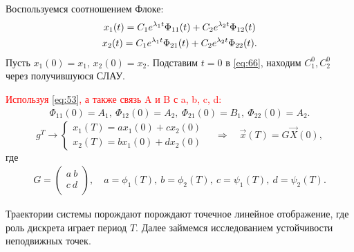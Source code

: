 Воспользуемся соотношением Флоке:
\begin{gather}
	x_1(t)=C_1 e^{\lambda_1 t}\Phi_{11}(t)+C_2 e^{\lambda_2 t}\Phi_{12}(t) \notag \\ 
	x_2(t)=C_1 e^{\lambda_1 t}\Phi_{21}(t)+C_2 e^{\lambda_2 t}\Phi_{22}(t).	
	\label{eq:66}
\end{gather}
Пусть $x_1(0)=x_1$, $x_2(0)=x_2$. Подставим $t=0$ в \eqref{eq:66}, находим $C_1^0, C_2^0$ через получившуюся СЛАУ. 

\markerr\textcolor{red}{
Используя \eqref{eq:53}, а также связь A и B с a, b, c, d:}
\begin{gather}
	\Phi_{11}(0)=A_1,~\Phi_{12}(0)=A_2,~\Phi_{21}(0)=B_1,~\Phi_{22}(0)=A_2.	
\end{gather}
\begin{equation}
	g^T\rightarrow
	\left\{\begin{aligned}
		x_1(T)=a x_1(0)+c x_2(0) \\
		x_2(T)=b x_1(0)+d x_2(0)		
	\end{aligned}\right. \quad\Rightarrow\quad
	\vec{x}(T)=G \vec{X}(0),
	\label{eq:68}
\end{equation}
где
\begin{gather*}
	G=
	\begin{pmatrix}
		a ~b \\
		c ~d \\
	\end{pmatrix}
	,\quad
	a=\phi_1(T), ~ b=\phi_2(T), ~
	c=\psi_1(T), ~ d=\psi_2(T).
\end{gather*}

Траектории системы порождают порождают точечное линейное отображение, где роль дискрета играет период $T$. Далее займемся исследованием устойчивости неподвижных точек. 




